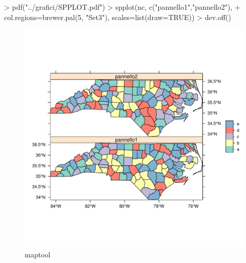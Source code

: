 \documentclass[onecolumn,11pt]{book}
\begin{document}
\begin{Schunk}
\begin{Sinput}
> pdf("../grafici/SPPLOT.pdf")
> spplot(nc, c("pannello1","pannello2"), 
+ col.regions=brewer.pal(5, "Set3"), scales=list(draw=TRUE))
> dev.off()
\end{Sinput}
\end{Schunk}
\begin{figure}[htbp]
\begin{center}
\includegraphics[scale=0.6]{../grafici/SPPLOT.pdf}
\caption{maptool}
\label{default}
\end{center}
\end{figure}

\end{document}
